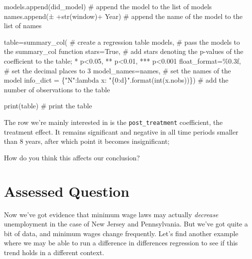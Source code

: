 \documentclass[
  letterpaper,
  DIV=11,
  numbers=noendperiod]{scrreprt}
\newenvironment{Shaded}{\begin{snugshade}}{\end{snugshade}}
\newcommand{\BuiltInTok}[1]{\textcolor[rgb]{0.00,0.23,0.31}{#1}}
\newcommand{\CommentTok}[1]{\textcolor[rgb]{0.37,0.37,0.37}{#1}}
\newcommand{\KeywordTok}[1]{\textcolor[rgb]{0.00,0.23,0.31}{#1}}
\newcommand{\NormalTok}[1]{\textcolor[rgb]{0.00,0.23,0.31}{#1}}
\newcommand{\OperatorTok}[1]{\textcolor[rgb]{0.37,0.37,0.37}{#1}}
\newcommand{\SpecialCharTok}[1]{\textcolor[rgb]{0.37,0.37,0.37}{#1}}
\newcommand{\StringTok}[1]{\textcolor[rgb]{0.13,0.47,0.30}{#1}}
\newcommand{\VariableTok}[1]{\textcolor[rgb]{0.07,0.07,0.07}{#1}}
\begin{document}
\begin{Shaded}
\begin{Highlighting}[]
\NormalTok{    models.append(did\_model) }\CommentTok{\# append the model to the list of models}
\NormalTok{    names.append(}\StringTok{\textquotesingle{}± \textquotesingle{}}\OperatorTok{+}\BuiltInTok{str}\NormalTok{(window)}\OperatorTok{+}\StringTok{\textquotesingle{} Year\textquotesingle{}}\NormalTok{) }\CommentTok{\# append the name of the model to the list of names}

\NormalTok{table}\OperatorTok{=}\NormalTok{summary\_col( }\CommentTok{\# create a regression table }
\NormalTok{    models, }\CommentTok{\# pass the models to the summary\_col function}
\NormalTok{    stars}\OperatorTok{=}\VariableTok{True}\NormalTok{, }\CommentTok{\# add stars denoting the p{-}values of the coefficient to the table; * p\textless{}0.05, ** p\textless{}0.01, *** p\textless{}0.001}
\NormalTok{    float\_format}\OperatorTok{=}\StringTok{\textquotesingle{}}\SpecialCharTok{\%0.3f}\StringTok{\textquotesingle{}}\NormalTok{, }\CommentTok{\# set the decimal places to 3}
\NormalTok{    model\_names}\OperatorTok{=}\NormalTok{names, }\CommentTok{\# set the names of the model}
\NormalTok{    info\_dict }\OperatorTok{=}\NormalTok{ \{}\StringTok{"N"}\NormalTok{:}\KeywordTok{lambda}\NormalTok{ x: }\StringTok{"}\SpecialCharTok{\{0:d\}}\StringTok{"}\NormalTok{.}\BuiltInTok{format}\NormalTok{(}\BuiltInTok{int}\NormalTok{(x.nobs))\}) }\CommentTok{\# add the number of observations to the table}

\BuiltInTok{print}\NormalTok{(table) }\CommentTok{\# print the table}
\end{Highlighting}
\end{Shaded}

The row we're mainly interested in is the \texttt{post\_treatment}
coefficient, the treatment effect. It remains significant and negative
in all time periods smaller than 8 years, after which point it becomes
insignificant;

How do you think this affects our conclusion?


\hypertarget{assessed-question-7}{%
\chapter{Assessed Question}\label{assessed-question-7}}

Now we've got evidence that minimum wage laws may actually
\emph{decrease} unemployment in the case of New Jersey and Pennsylvania.
But we've got quite a bit of data, and minimum wages change frequently.
Let's find another example where we may be able to run a difference in
differences regression to see if this trend holds in a different
context.
\end{document}
